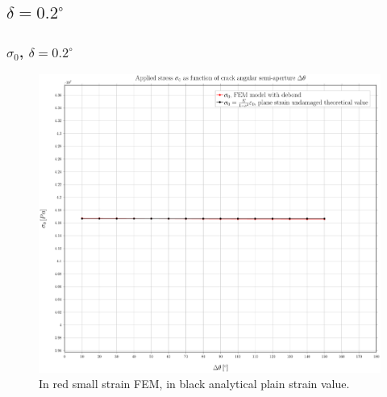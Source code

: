 \documentclass[first,firstsupp,lastsupp,handout,last,hyperref,table]{ETHclass}
\begin{document}

\subsection{$\delta=0.2^{\circ}$}

\begin{frame}
\frametitle{\small $\sigma_{0}$, $\delta=0.2^{\circ}$}
\vspace{-0.5cm}
\centering
\captionsetup[figure]{font=scriptsize,labelfont=scriptsize}
\begin{figure}[!h]
\centering
\includegraphics[height=0.7\textheight]{2017-07-10_AbqRunSummary_SmallStrainD02_sigma-inf_Summary.pdf}
  \caption{\scriptsize In red small strain FEM, in black analytical plain strain value.}
  \label{fig:res1}
\end{figure}
\end{frame}
\end{document}
